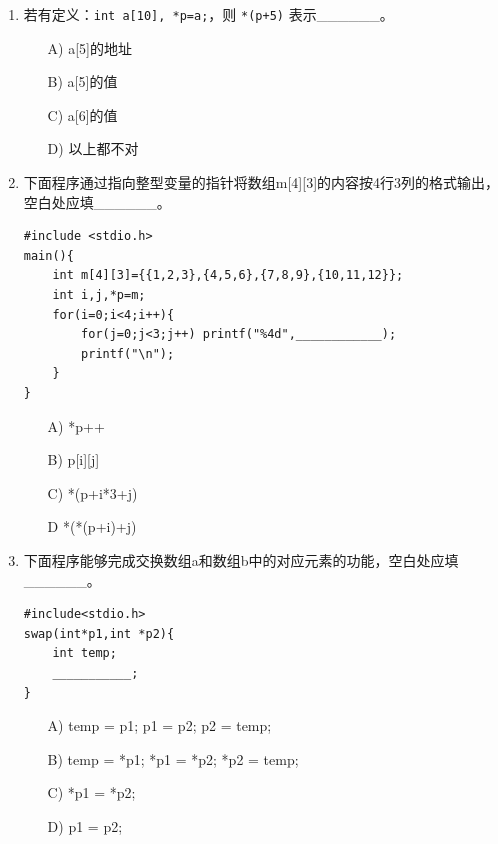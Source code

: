 \documentclass[a4paper,12pt]{article}
\begin{document}
\begin{enumerate}
	\item 若有定义：\texttt{int a[10], *p=a;}，则 \texttt{*(p+5)} 表示\_\_\_\_\_\_。
	      \begin{enumerate}
		      \item[A)] a[5]的地址
		      \item[B)] a[5]的值
		      \item[C)] a[6]的值
		      \item[D)] 以上都不对
	      \end{enumerate}
	      \vspace{0.3cm}

	\item 下面程序通过指向整型变量的指针将数组m[4][3]的内容按4行3列的格式输出，空白处应填\_\_\_\_\_\_。
	      \begin{verbatim}
#include <stdio.h>
main(){
    int m[4][3]={{1,2,3},{4,5,6},{7,8,9},{10,11,12}};
    int i,j,*p=m;
    for(i=0;i<4;i++){
        for(j=0;j<3;j++) printf("%4d",____________);
        printf("\n");
    }
}
    \end{verbatim}
	      \begin{enumerate}
		      \item[A)] *p++
		      \item[B)] p[i][j]
		      \item[C)] *(p+i*3+j)
		      \item[D] *(*(p+i)+j)
	      \end{enumerate}
	      \vspace{0.3cm}

	\item 下面程序能够完成交换数组a和数组b中的对应元素的功能，空白处应填\_\_\_\_\_\_。
	      \begin{verbatim}
#include<stdio.h>
swap(int*p1,int *p2){
    int temp;
    ___________;
}
    \end{verbatim}
	      \begin{enumerate}
		      \item[A)] temp = p1; p1 = p2; p2 = temp;
		      \item[B)] temp = *p1; *p1 = *p2; *p2 = temp;
		      \item[C)] *p1 = *p2;
		      \item[D)] p1 = p2;
	      \end{enumerate}
	      \vspace{0.3cm}


\end{enumerate}
\end{document}
